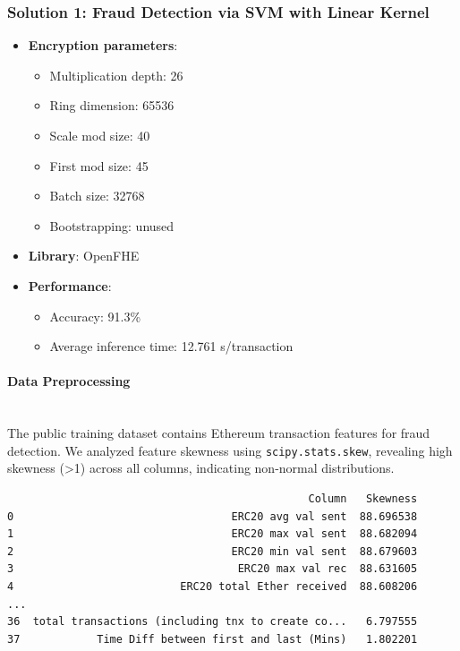 \documentclass[article]{iacrtrans}
\newcommand{\ahmad}[1]{{\color{purple} [Ahmad: #1]}}
\begin{document}
\subsubsection{Solution 1: Fraud Detection via SVM with Linear Kernel}

\begin{itemize}
    \item \textbf{Encryption parameters}: 
        \begin{itemize}
            \item Multiplication depth: 26
            \item Ring dimension: 65536
            \item Scale mod size: 40
            \item First mod size: 45
            \item Batch size: 32768
            \item Bootstrapping: unused
        \end{itemize}
    \item \textbf{Library}: OpenFHE \cite{OpenFHE}
    \item \textbf{Performance}: 
        \begin{itemize}
            \item Accuracy: 91.3\%
            \item Average inference time: 12.761 s/transaction
        \end{itemize}
\end{itemize}


\paragraph{Data Preprocessing}\mbox{}\\

The public training dataset contains Ethereum transaction features for fraud detection. We analyzed feature skewness using \texttt{scipy.stats.skew}, revealing high skewness (>1) across all columns, indicating non-normal distributions.

\begin{lstlisting}
                                               Column   Skewness
0                                  ERC20 avg val sent  88.696538
1                                  ERC20 max val sent  88.682094
2                                  ERC20 min val sent  88.679603
3                                   ERC20 max val rec  88.631605
4                          ERC20 total Ether received  88.608206
...
36  total transactions (including tnx to create co...   6.797555
37            Time Diff between first and last (Mins)   1.802201
\end{lstlisting}
\end{document}
